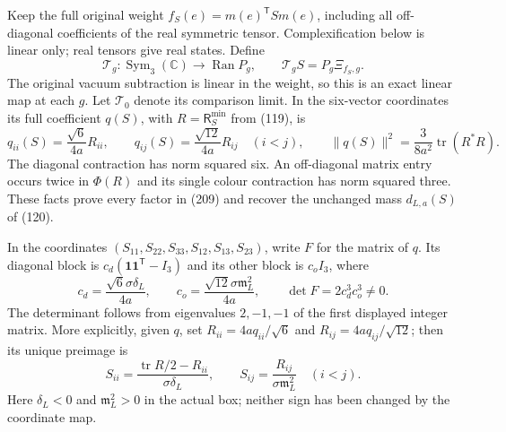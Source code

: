 \documentclass[11pt]{article}
\begin{document}
Keep the full original weight $f_S(e)=m(e)^{\mathsf T}S m(e)$,
including all off-diagonal coefficients of the real symmetric tensor.
Complexification below is linear only; real tensors give real states.
Define
\begin{equation}\label{eq:band-tensor-map}
 \mathcal T_g:\operatorname{Sym}_3(\mathbb C)\longrightarrow
       \operatorname{Ran}P_g,\qquad
 \mathcal T_gS=P_g\Xi_{f_S,g}.
\end{equation}
The original vacuum subtraction is linear in the weight, so this
is an exact linear map at each $g$. Let $\mathcal T_0$ denote its
comparison limit. In the six-vector coordinates its full coefficient
$q(S)$, with $R=\mathsf R_S^{\min}$ from (119), is
\begin{equation}\label{eq:band-q}
 q_{ii}(S)=\frac{\sqrt6}{4a}R_{ii},\qquad
 q_{ij}(S)=\frac{\sqrt{12}}{4a}R_{ij}\quad(i<j),\qquad
 \|q(S)\|^2=\frac3{8a^2}\operatorname{tr}(R^*R).
\end{equation}
The diagonal contraction has norm squared six. An off-diagonal
matrix entry occurs twice in $\Phi(R)$ and its single colour
contraction has norm squared three. These facts prove every factor
in (209) and recover the unchanged mass
$d_{L,a}(S)$ of (120).

In the coordinates $(S_{11},S_{22},S_{33},S_{12},S_{13},S_{23})$,
write $F$ for the matrix of $q$. Its diagonal block is
$c_d(\boldsymbol 1\boldsymbol 1^{\mathsf T}-I_3)$ and its other
block is $c_oI_3$, where
\[
 c_d=\frac{\sqrt6\sigma\delta_L}{4a},\qquad
 c_o=\frac{\sqrt{12}\sigma\mathfrak m_L^2}{4a},\qquad
 \det F=2c_d^3c_o^3\ne0.
\]
The determinant follows from eigenvalues $2,-1,-1$ of the first
displayed integer matrix. More explicitly, given $q$, set
$R_{ii}=4a q_{ii}/\sqrt6$ and $R_{ij}=4a q_{ij}/\sqrt{12}$;
then its unique preimage is
\begin{equation}\label{eq:band-F-inverse}
 S_{ii}=\frac{\operatorname{tr}R/2-R_{ii}}{\sigma\delta_L},
 \qquad S_{ij}=\frac{R_{ij}}{\sigma\mathfrak m_L^2}\quad(i<j).
\end{equation}
Here $\delta_L<0$ and $\mathfrak m_L^2>0$ in the actual box;
neither sign has been changed by the coordinate map.
\end{document}
